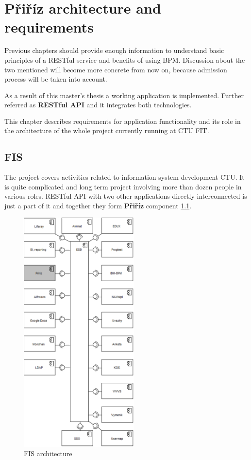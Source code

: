 \chapter{Přiříz architecture and requirements}\label{architecture}

	Previous chapters should provide enough information to understand basic principles of a RESTful service and benefits of
	using BPM. Discussion about the two mentioned will become more concrete from now on, because admission process will be
	taken into account.
	
	As a result of this master's thesis a working application is implemented. Further referred as \textbf{RESTful API} and
	it integrates both technologies.
	 	
	This chapter describes requirements for application functionality and its role in the architecture of the whole project
	currently running at CTU FIT.

	\section{\gls{FIS}}
	
	The project covers activities related to information system development CTU. It is quite complicated and long term
	project involving more than dozen people in various roles. RESTful API with two other applications directly
	interconnected is just a part of it and together they form \textbf{Přiříz} component \ref{fig:fis_architecture}.
	
	\newpage
	\begin{figure}[h]
		\label{fig:fis_architecture}
	  	\centering
	    \includegraphics[width=6cm]{figures/fis_architecture}
	  	\caption{FIS architecture}
	\end{figure}
	
